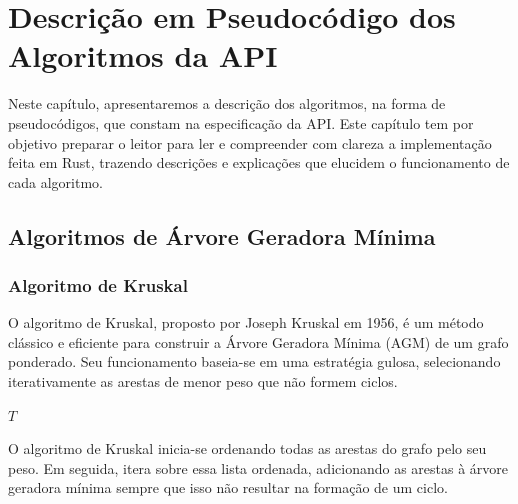 \chapter{Descrição em Pseudocódigo dos Algoritmos da API}
\label{ch:pseudocode}

Neste capítulo, apresentaremos a descrição dos algoritmos, na forma
de pseudocódigos, que constam na especificação da API. Este capítulo
tem por objetivo preparar o leitor para ler e compreender com clareza
a implementação feita em Rust, trazendo descrições e explicações que
elucidem o funcionamento de cada algoritmo.

\section{Algoritmos de Árvore Geradora Mínima}

\subsection{Algoritmo de Kruskal}
\label{sec:pseudocode_kruskal}

O algoritmo de Kruskal, proposto por Joseph Kruskal em 1956, é um método
clássico e eficiente para construir a Árvore Geradora Mínima (AGM) de um
grafo ponderado. Seu funcionamento baseia-se em uma estratégia gulosa,
selecionando iterativamente as arestas de menor peso que não formem ciclos.

\begin{algorithm}
  \caption{Algoritmo de Kruskal}
  \begin{algorithmic}[0]
    \Statex
      \EndFor
        \EndIf
      \EndFor
      \State \Return $T$
    \EndFunction
  \end{algorithmic}
\end{algorithm}
\FloatBarrier

O algoritmo de Kruskal inicia-se ordenando todas as arestas do grafo
pelo seu peso. Em seguida, itera sobre essa lista ordenada, adicionando
as arestas à árvore geradora mínima sempre que isso não resultar na
formação de um ciclo.

